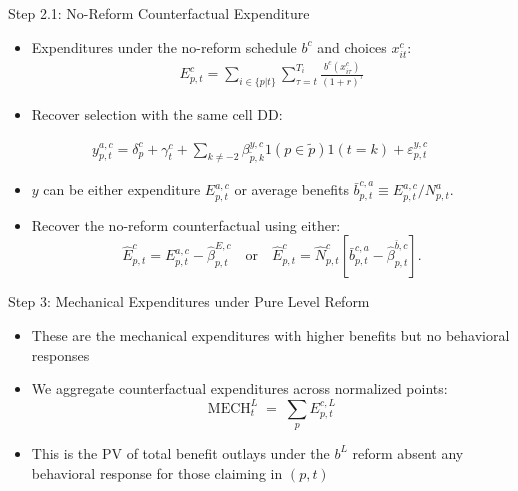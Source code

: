 \begin{frame}{Step 2.1: No-Reform Counterfactual Expenditure}
\begin{itemize}
    \item Expenditures under the no-reform schedule $b^c$ and choices $x^c_{it}$: 
    \begin{align*}
        E^{c}_{p,t}=\sum_{i \in \{p|t\}} \sum_{\tau=t}^{T_i} \frac{b^c(x^c_{i\tau})}{(1+r)^{\tau}}
    \end{align*}
    \item Recover selection with the same cell DD:
\end{itemize}
\vspace{-0.7em}
{\small
\begin{align*}
    y^{a,c}_{p,t}
    =
    \delta_{p}^{c}
    +
    \gamma_t^{c}
    +
    \sum_{k\neq -2}\beta_{\tilde p,k}^{y,c}
    1(p\in \tilde p)1(t=k)
    +
    \varepsilon_{p,t}^{y,c}
\end{align*}}
\vspace{-1.0em}
\begin{itemize}
    \item $y$ can be either expenditure $E^{a,c}_{p,t}$ or average benefits $\bar b^{c,a}_{p,t}\equiv E^{a,c}_{p,t}/N^a_{p,t}$.
    \item Recover the no-reform counterfactual using either:
    \[
        \widehat E^{c}_{p,t}
        =
        E^{a,c}_{p,t}
        -
        \widehat\beta^{E,c}_{p,t}
        \quad\text{or}\quad
        \widehat E^{c}_{p,t}
        =
        \widehat N^{c}_{p,t}
        \left[
        \bar b^{c,a}_{p,t}
        -
        \widehat\beta^{\bar b,c}_{p,t}
        \right].
    \]
\end{itemize}
\end{frame}

\begin{frame}{Step 3: Mechanical Expenditures under Pure Level Reform}
\begin{itemize}
    \item These are the mechanical expenditures with higher benefits but no behavioral responses


    \item We aggregate {counterfactual expenditures} across normalized points:
    \[
        \text{MECH}^{L}_t
        \;=\;
        \sum_{p} {E^{c,L}_{p,t}}
    \]

    \item This is the PV of total benefit outlays under the $b^L$ reform absent any behavioral response for those claiming in $(p,t)$
\end{itemize}
\end{frame}

